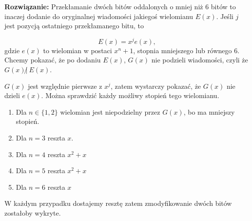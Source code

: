 \documentclass[12pt,a4paper]{article}
\begin{document}
\vskip5pt
\noindent
\textbf{Rozwiązanie:} Przekłamanie dwóch bitów oddalonych o mniej niż 6 bitów to inaczej dodanie do oryginalnej wiadomości jakiegoś wielomianu \(E(x)\). Jeśli \(j\) jest pozycją ostatniego przekłamanego bitu, to

\[
	E(x) = x^je(x),
\]
gdzie \(e(x)\) to wielomian w postaci \(x^n + 1\), stopnia mniejszego lub równego 6.
Chcemy pokazać, że po dodaniu \(E(x)\), \(G(x)\) nie podzieli wiadomości, czyli że \( G(x) \not|~ E(x)\).

\(G(x)\) jest względnie pierwsze z \(x^j\), zatem wystarczy pokazać, że \(G(x)\) nie dzieli \(e(x)\). Można sprawdzić każdy możliwy stopień tego wielomianu.

\begin{enumerate}
	\item Dla \(n \in \{1,2\}\) wielomian jest niepodzielny przez \(G(x)\), bo ma mniejszy stopień.
	\item Dla \(n = 3\) reszta \(x\).
	\item Dla \(n = 4\) reszta \(x^2 + x\)
	\item Dla \(n = 5\) reszta \(x^2 + x\)
	\item Dla \(n = 6\) reszta \(x\)
\end{enumerate}
W każdym przypadku dostajemy resztę zatem zmodyfikowanie dwóch bitów zostałoby wykryte.
\end{document}
